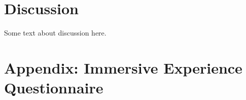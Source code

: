 \documentclass[12pt,twoside,english]{article}
\begin{document}
\section{Discussion}
\label{sect:discussion}

Some text about discussion here.




% 


\appendix
\section{Appendix: Immersive Experience Questionnaire}
\label{sect:appendix}
\label{sect:ieq}


\clearpage
\end{document}
